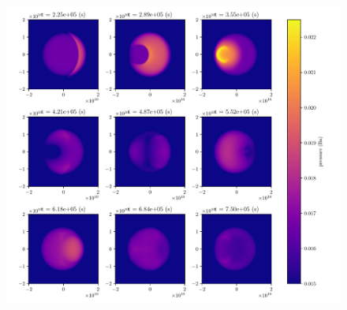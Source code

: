 \documentclass[a4paper]{article}
\let\oldcap\caption
\renewcommand{\caption}[1]{\parbox{.9\linewidth}{\oldcap{#1}}}
\begin{document}
\begin{figure}[h]
    \centering
    \includegraphics[width=1\textwidth]{figures/plume_reflection.pdf}
    \caption{}
    \label{fig:figures-plume_reflection-pdf}
\end{figure}
\printbibliography
\end{document}
